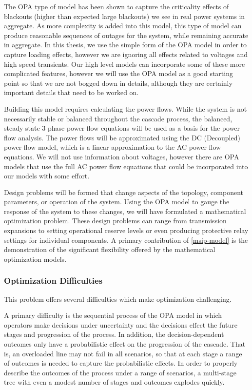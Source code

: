 The OPA type of model has been shown to capture the criticality effects of blackouts (higher than expected large blackouts) we see in real power systems in aggregate.  As more complexity is added into this model, this type of model can produce reasonable sequences of outages for the system, while remaining accurate in aggregate. In this thesis, we use the simple form of the OPA model in order to capture loading effects, however we are ignoring all effects related to voltages and high speed transients.  Our high level models can incorporate some of these more complicated features, however we will use the OPA model as a good starting point so that we are not bogged down in details, although they are certainly important details that need to be worked on.

Building this model requires calculating the power flows.  While the system is not necessarily stable or balanced throughout the cascade process, the balanced, steady state 3 phase power flow equations will be used as a basis for the power flow analysis.  The power flows will be approximated using the DC (Decoupled) power flow model, which is a linear approximation to the AC power flow equations.  We will not use information about voltages, however there are OPA models that use the full AC power flow equations that could be incorporated into our models with some effort.

Design problems will be formed that change aspects of the topology, component parameters, or operation of the system.  Using the OPA model to gauge the response of the system to these changes, we will have formulated a mathematical optimization problem.  These design problems can range from transmission expansions to setting operational reserve levels or even producing protective relay settings for individual components.  A primary contribution of \cref{msip-model} is the demonstration of the significant flexibility offered by the mathematical optimization models.

\subsubsection{Optimization Difficulties}
This problem offers several difficulties which make optimization challenging.  

A primary difficulty is the sequential process of the OPA model in which operators make decisions under uncertainty and the decisions effect the future stages and progression of the process.  In addition, the decision-dependent outcomes only have a probabilistic effect on the progression of the cascade.  That is, an overloaded line may not fail in all scenarios, so that at each stage a range of outcomes is needed to capture the probabilistic effects.  In order to properly describe the outcomes of the process under a range of scenarios, a multi-stage tree with even a modest number of stages and outcomes explodes quickly.

